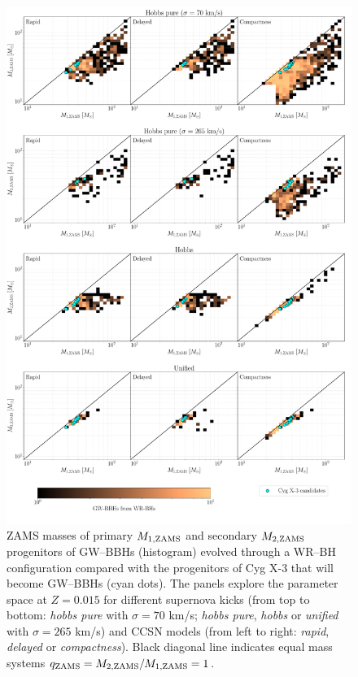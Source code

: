 \documentclass[a4paper,titlepage]{book}     	%
\begin{document}
\begin{figure}[h!]
	\centering
	\includegraphics[width=\textwidth]{./images/kickcompare_progM1M2_015.pdf}	
	\caption{ZAMS masses of primary $M_{\rm 1, ZAMS}$ and secondary $M_{\rm 2, ZAMS}$ progenitors of GW--BBHs (histogram) evolved through a WR--BH configuration compared with the progenitors of Cyg X-3 that will become GW--BBHs (cyan dots). The panels explore the parameter space at $Z=0.015$ for different supernova kicks (from top to bottom: \emph{hobbs pure} with $\sigma = 70$ km/s; \emph{hobbs pure}, \emph{hobbs} or \emph{unified} with $\sigma = 265$ km/s) and CCSN models (from left to right: \emph{rapid}, \emph{delayed} or \emph{compactness}). Black diagonal line indicates equal mass systems $q_{\rm ZAMS}=M_{\rm 2, ZAMS}/M_{\rm 1,ZAMS} = 1$.}\label{fig:resultsCygX3progM1M2GWBBHs}
\end{figure}
\end{document}
